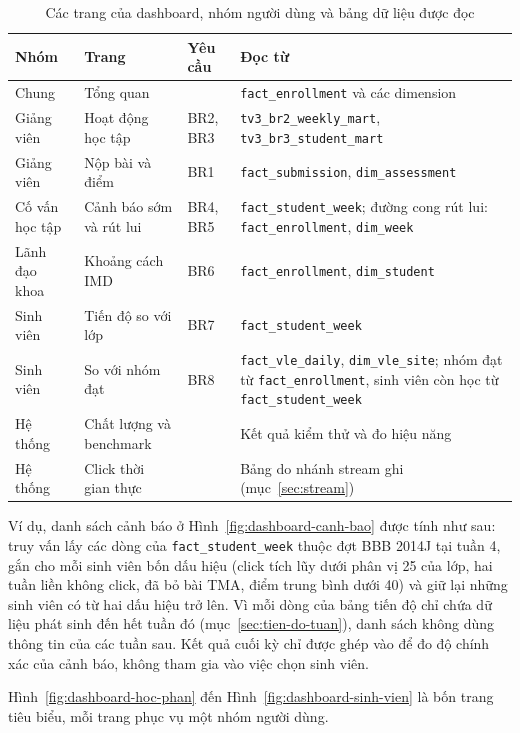 \begin{table}[htbp]
\centering
\footnotesize
\begin{tabularx}{\textwidth}{|p{1.9cm}|p{3.0cm}|p{1.3cm}|X|}
\hline
\textbf{Nhóm} & \textbf{Trang} & \textbf{Yêu cầu} & \textbf{Đọc từ} \\ \hline
Chung & Tổng quan & & \texttt{fact\_enrollment} và các dimension \\ \hline
Giảng viên & Hoạt động học tập & BR2, BR3 & \texttt{tv3\_br2\_weekly\_mart}, \texttt{tv3\_br3\_student\_mart} \\ \hline
Giảng viên & Nộp bài và điểm & BR1 & \texttt{fact\_submission}, \texttt{dim\_assessment} \\ \hline
Cố vấn học tập & Cảnh báo sớm và rút lui & BR4, BR5 & \texttt{fact\_student\_week}; đường cong rút lui: \texttt{fact\_enrollment}, \texttt{dim\_week} \\ \hline
Lãnh đạo khoa & Khoảng cách IMD & BR6 & \texttt{fact\_enrollment}, \texttt{dim\_student} \\ \hline
Sinh viên & Tiến độ so với lớp & BR7 & \texttt{fact\_student\_week} \\ \hline
Sinh viên & So với nhóm đạt & BR8 & \texttt{fact\_vle\_daily}, \texttt{dim\_vle\_site}; nhóm đạt từ \texttt{fact\_enrollment}, sinh viên còn học từ \texttt{fact\_student\_week} \\ \hline
Hệ thống & Chất lượng và benchmark & & Kết quả kiểm thử và đo hiệu năng \\ \hline
Hệ thống & Click thời gian thực & & Bảng do nhánh stream ghi (mục~\ref{sec:stream}) \\ \hline
\end{tabularx}
\caption{Các trang của dashboard, nhóm người dùng và bảng dữ liệu được đọc}
\label{tab:trang}
\end{table}

Ví dụ, danh sách cảnh báo ở Hình~\ref{fig:dashboard-canh-bao} được tính như sau: truy vấn lấy
các dòng của \texttt{fact\_student\_week} thuộc đợt BBB 2014J tại tuần 4, gắn cho mỗi sinh viên
bốn dấu hiệu (click tích lũy dưới phân vị 25 của lớp, hai tuần liền không click, đã bỏ bài TMA,
điểm trung bình dưới 40) và giữ lại những sinh viên có từ hai dấu hiệu trở lên. Vì mỗi dòng của
bảng tiến độ chỉ chứa dữ liệu phát sinh đến hết tuần đó (mục~\ref{sec:tien-do-tuan}), danh sách
không dùng thông tin của các tuần sau. Kết quả cuối kỳ chỉ được ghép vào để đo độ chính xác của
cảnh báo, không tham gia vào việc chọn sinh viên.

Hình~\ref{fig:dashboard-hoc-phan} đến Hình~\ref{fig:dashboard-sinh-vien} là bốn trang tiêu biểu,
mỗi trang phục vụ một nhóm người dùng.

